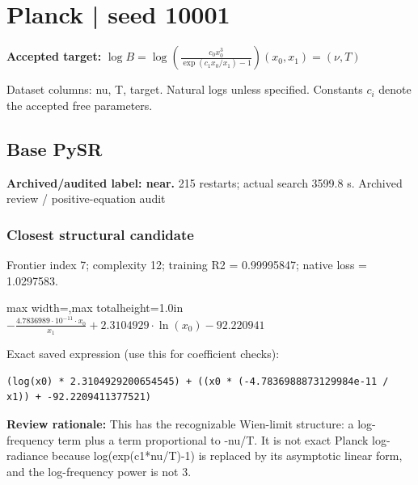 \documentclass[10pt,letterpaper,landscape]{article}
\begin{document}
\section*{Planck | seed 10001}
\textbf{Accepted target:} $\displaystyle \log B=\log\!\left(\frac{c_0 x_0^3}{\exp(c_1x_0/x_1)-1}\right)$\hfill $(x_0,x_1)=(\nu,T)$\par
{\small Dataset columns: nu, T, target. Natural logs unless specified. Constants $c_i$ denote the accepted free parameters.}\par\medskip
\begin{minipage}[t]{0.485\textwidth}
\subsection*{Base PySR}
\textbf{Archived/audited label: near.} 215 restarts; actual search 3599.8 s.
{\small Archived review / positive-equation audit}
\subsubsection*{Closest structural candidate}
Frontier index 7; complexity 12; training R2 = 0.99995847; native loss = 1.0297583.
\begin{center}\begin{adjustbox}{max width=\linewidth,max totalheight=1.0in}$\displaystyle - \frac{4.7836989 \cdot 10^{-11} \cdot x_{0}}{x_{1}} + 2.3104929 \cdot \ln{\left(x_{0} \right)} - 92.220941$\end{adjustbox}\end{center}
{\scriptsize Exact saved expression (use this for coefficient checks):}
\begin{lstlisting}
(log(x0) * 2.3104929200654545) + ((x0 * (-4.7836988873129984e-11 / x1)) + -92.2209411377521)
\end{lstlisting}
{\small\textbf{Review rationale:} This has the recognizable Wien-limit structure: a log-frequency term plus a term proportional to -nu/T. It is not exact Planck log-radiance because log(exp(c1*nu/T)-1) is replaced by its asymptotic linear form, and the log-frequency power is not 3.}

\end{minipage}
\end{document}
